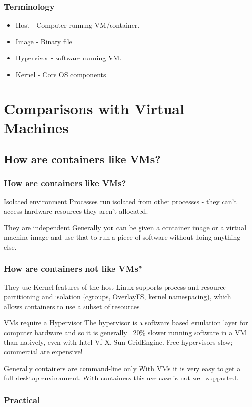 \documentclass{beamer}
\begin{document}

\begin{frame}
\frametitle{Terminology}
\begin{itemize}
\item Host - Computer running VM/container.
\item Image - Binary file 
\item Hypervisor - software running VM.
\item Kernel - Core OS components
\end{itemize}
\end{frame}


\section{Comparisons with Virtual Machines}
\subsection{How are containers like VMs?}
\begin{frame}
\frametitle{How are containers like VMs?}
\begin{block}{Isolated environment}
Processes run isolated from other processes - they can't access hardware resources they aren't allocated.
\end{block}

\begin{block}{They are independent}
Generally you can be given a container image or a virtual machine image and use that to run a piece of software without doing anything else.
\end{block}

\end{frame}

\begin{frame}
\frametitle{How are containers not like VMs?}
\begin{block}{They use Kernel features of the host}
Linux supports process and resource partitioning and isolation (cgroups, OverlayFS, kernel namespacing), which allows containers to use a subset of resources.
\end{block}

\begin{block}{VMs require a Hypervisor}
The hypervisor is a software based emulation layer for computer hardware and so it is generally ~20\% slower running software in a VM than natively, even with Intel Vf-X, Sun GridEngine. Free hypervisors slow; commercial are expensive!
\end{block}

\begin{block}{Generally containers are command-line only}
With VMs it is very easy to get a full desktop environment. With containers this use case is not well supported.
\end{block}
\end{frame}


\begin{frame}
\frametitle{Practical}

\end{frame}
\end{document}
